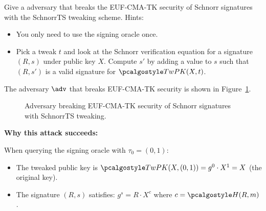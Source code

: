 \begin{exercise}
  Give a \ppt adversary that breaks the EUF-CMA-TK security of Schnorr signatures with the SchnorrTS tweaking scheme. Hints:
  \begin{itemize}
    \item You only need to use the signing oracle once.
    \item Pick a tweak $t$ and look at the Schnorr verification equation for a signature $(R, s)$ under public key $X$. Compute $s'$ by adding a value to $s$ such that $(R, s')$ is a valid signature for $\algo{TwPK}(X, t)$.
  \end{itemize}
\end{exercise}

\ifsolutions
\begin{mysolution}
  The adversary $\adv$ that breaks EUF-CMA-TK security is shown in Figure~\ref{fig:adversary-euf-cma-tk}.

  \begin{figure}[htb]
    \begin{center}
      \begin{tcolorbox}[width=7cm]
        \begin{pchstack}[center]
        \end{pchstack}
      \end{tcolorbox}
    \end{center}
    \caption{Adversary breaking EUF-CMA-TK security of Schnorr signatures with SchnorrTS tweaking.}
    \label{fig:adversary-euf-cma-tk}
  \end{figure}

  \textbf{Why this attack succeeds:}
  
  When querying the signing oracle with $\tau_0 = (0, 1)$:
  \begin{itemize}
    \item The tweaked public key is $\algo{TwPK}(X, (0, 1)) = g^0 \cdot X^1 = X$ (the original key).
    \item The signature $(R, s)$ satisfies: $g^s = R \cdot X^c$ where $c = \algo{H}(R, m)$.
  \end{itemize}
  

\end{mysolution}
